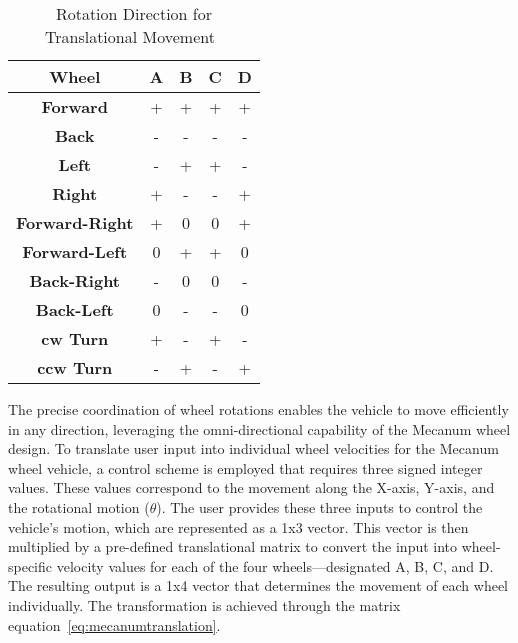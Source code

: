 \begin{table}[h]
	\centering
	
	\caption{Rotation Direction for Translational Movement~\cite{Tlale.2008}}
	\begin{tabular}{c||c|c|c|c}
		\hline
		Wheel & \textbf{A} & \textbf{B} & \textbf{C} & \textbf{D} \\
		\hline
		\hline
		\textbf{Forward} & + & + & + & + \\
		\hline
		\textbf{Back} & - & - & - & - \\
		\hline
		\textbf{Left} & - & + & + & - \\
		\hline
		\textbf{Right} & + & - & - & + \\
		\hline
		\textbf{Forward-Right} & + & 0 & 0 & + \\
		\hline
		\textbf{Forward-Left} & 0 & + & + & 0 \\
		\hline
		\textbf{Back-Right} & - & 0 & 0 & - \\
		\hline
		\textbf{Back-Left} & 0 & - & - & 0 \\
		\hline
		\textbf{\acs{cw} Turn} & + & - & + & - \\
		\hline
		\textbf{\acs{ccw} Turn} & - & + & - & + \\
		\hline
	\end{tabular}
	\label{tab:mecanumdirection}
\end{table}

The precise coordination of wheel rotations enables the vehicle to move efficiently in any direction, leveraging the omni-directional capability of the Mecanum wheel design.
To translate user input into individual wheel velocities for the Mecanum wheel vehicle, a control scheme is employed that requires three signed integer values. These values correspond to the movement along the X-axis, Y-axis, and the rotational motion ($\theta$). The user provides these three inputs to control the vehicle's motion, which are represented as a 1x3 vector. This vector is then multiplied by a pre-defined translational matrix to convert the input into wheel-specific velocity values for each of the four wheels—designated A, B, C, and D. The resulting output is a 1x4 vector that determines the movement of each wheel individually. The transformation is achieved through the matrix equation~\ref{eq:mecanumtranslation}.

